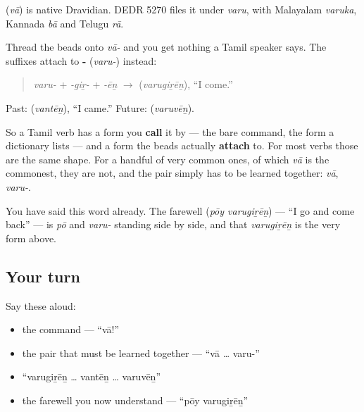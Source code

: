 \begin{cousinweb}
\textbf{} (\emph{vā}) is native Dravidian. DEDR 5270 files it under \emph{varu}, with Malayalam \emph{varuka}, Kannada \emph{bā} and Telugu \emph{rā}.
\end{cousinweb}

\begin{grammarlens}[title={Grammar Lens: the word you say it by is not the word you build on}]
Thread the beads onto \emph{vā-} and you get nothing a Tamil speaker says. The suffixes attach to \textbf{-} (\emph{varu-}) instead:

\begin{quote}
\emph{varu-} + \emph{-giṟ-} + \emph{-ēṉ} $\to$ \textbf{} (\emph{varugiṟēṉ}), \textquotedblleft{}I come.\textquotedblright{}
\end{quote}

Past: \textbf{} (\emph{vantēṉ}), \textquotedblleft{}I came.\textquotedblright{} Future: \textbf{} (\emph{varuvēṉ}).

So a Tamil verb has a form you \textbf{call} it by — the bare command, the form a dictionary lists — and a form the beads actually \textbf{attach} to. For most verbs those are the same shape. For a handful of very common ones, of which \emph{vā} is the commonest, they are not, and the pair simply has to be learned together: \emph{vā}, \emph{varu-}.

You have said this word already. The farewell \textbf{ } (\emph{pōy varugiṟēṉ}) — \textquotedblleft{}I go and come back\textquotedblright{} — is \emph{pō} and \emph{varu-} standing side by side, and that \emph{varugiṟēṉ} is the very form above.
\end{grammarlens}

\subsection*{Your turn}
Say these aloud:

\begin{itemize}
\raggedright
  \item the command — \textquotedblleft{}vā!\textquotedblright{}
  \item the pair that must be learned together — \textquotedblleft{}vā … varu-\textquotedblright{}
  \item \textquotedblleft{}varugiṟēṉ … vantēṉ … varuvēṉ\textquotedblright{}
  \item the farewell you now understand — \textquotedblleft{}pōy varugiṟēṉ\textquotedblright{}
\end{itemize}

